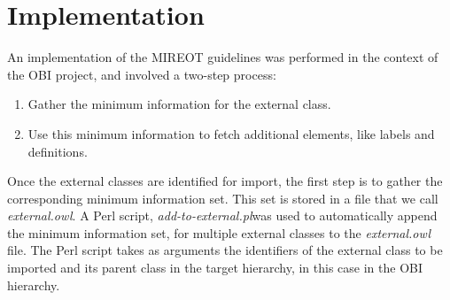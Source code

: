 \documentclass[a4paper,10pt,twocolumn]{article}
\newcommand{\protege}{Prot\'{e}g\'{e}}
\begin{document}


\section*{Implementation}

An implementation of the \ac{MIREOT} guidelines was performed in the context of the \ac{OBI} project, and involved a two-step process:

\begin{enumerate}
\item Gather the minimum information for the external class.
\item Use this minimum information to fetch additional elements, like labels and definitions.
\end{enumerate}




Once the external classes are identified for import, the first step is to gather the corresponding minimum information set.
This set is stored in a file that we call \emph{external.owl}.
A Perl script, \emph{add-to-external.pl}was used to automatically append the minimum information set, for multiple external classes to the \emph{external.owl} file. 
The Perl script takes as arguments the identifiers of the external class to be imported and its parent class in the target hierarchy, in this case in the \ac{OBI} hierarchy. 
\end{document}
